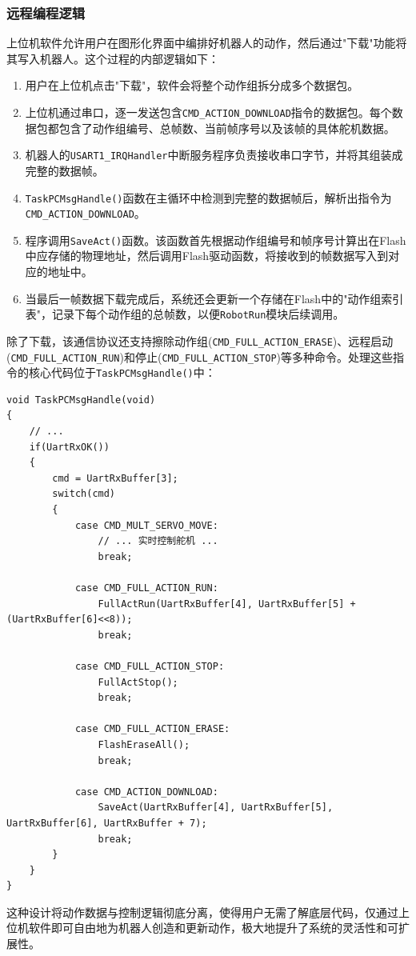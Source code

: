 \documentclass[a4paper,fontset=windows]{ctexart}
\providecommand{\tightlist}{%
  \setlength{\itemsep}{0pt}\setlength{\parskip}{0pt}}
\begin{document}
\subsubsection{远程编程逻辑}
上位机软件允许用户在图形化界面中编排好机器人的动作，然后通过"下载"功能将其写入机器人。这个过程的内部逻辑如下：
\begin{enumerate}[label=\arabic*)]
    \tightlist
    \item 用户在上位机点击"下载"，软件会将整个动作组拆分成多个数据包。
    \item 上位机通过串口，逐一发送包含\texttt{CMD\_ACTION\_DOWNLOAD}指令的数据包。每个数据包都包含了动作组编号、总帧数、当前帧序号以及该帧的具体舵机数据。
    \item 机器人的\texttt{USART1\_IRQHandler}中断服务程序负责接收串口字节，并将其组装成完整的数据帧。
    \item \texttt{TaskPCMsgHandle()}函数在主循环中检测到完整的数据帧后，解析出指令为\texttt{CMD\_ACTION\_DOWNLOAD}。
    \item 程序调用\texttt{SaveAct()}函数。该函数首先根据动作组编号和帧序号计算出在Flash中应存储的物理地址，然后调用Flash驱动函数，将接收到的帧数据写入到对应的地址中。
    \item 当最后一帧数据下载完成后，系统还会更新一个存储在Flash中的"动作组索引表"，记录下每个动作组的总帧数，以便\texttt{RobotRun}模块后续调用。
\end{enumerate}
除了下载，该通信协议还支持擦除动作组(\texttt{CMD\_FULL\_ACTION\_ERASE})、远程启动(\texttt{CMD\_FULL\_ACTION\_RUN})和停止(\texttt{CMD\_FULL\_ACTION\_STOP})等多种命令。处理这些指令的核心代码位于\texttt{TaskPCMsgHandle()}中：
\begin{verbatim}
void TaskPCMsgHandle(void)
{
	// ...
	if(UartRxOK())
	{
		cmd = UartRxBuffer[3];
 		switch(cmd)
 		{
 			case CMD_MULT_SERVO_MOVE:
				// ... 实时控制舵机 ...
 				break;
			
			case CMD_FULL_ACTION_RUN:
				FullActRun(UartRxBuffer[4], UartRxBuffer[5] + (UartRxBuffer[6]<<8));
				break;
				
			case CMD_FULL_ACTION_STOP:
				FullActStop();
				break;
				
			case CMD_FULL_ACTION_ERASE:
				FlashEraseAll();
				break;

			case CMD_ACTION_DOWNLOAD:
				SaveAct(UartRxBuffer[4], UartRxBuffer[5], UartRxBuffer[6], UartRxBuffer + 7);
				break;
 		}
	}
}
\end{verbatim}
这种设计将动作数据与控制逻辑彻底分离，使得用户无需了解底层代码，仅通过上位机软件即可自由地为机器人创造和更新动作，极大地提升了系统的灵活性和可扩展性。
\end{document}
